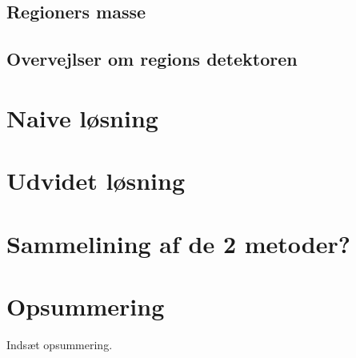 {\subsection{Regioners masse}


\subsection{Overvejlser om regions detektoren}


\section{Naive løsning}

\clearpage

\section{Udvidet løsning}

\clearpage

\section{Sammelining af de 2 metoder?}

\clearpage

\section*{Opsummering}
Indsæt opsummering.

}

